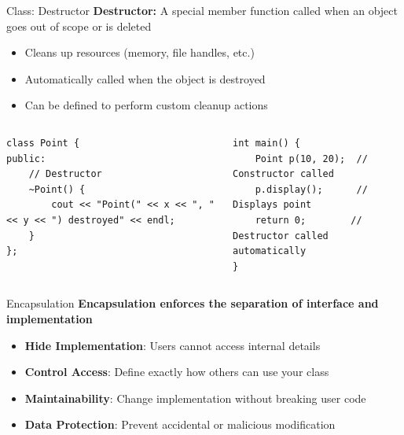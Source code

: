 \begin{frame}[fragile]{Class: Destructor}
	\textbf{Destructor:} A special member function called when an object goes out of scope or is deleted
	\begin{itemize}
		\item Cleans up resources (memory, file handles, etc.)
		\item Automatically called when the object is destroyed
		\item Can be defined to perform custom cleanup actions
	\end{itemize}

    \begin{columns}
        \begin{column}{0.5\textwidth}
	\begin{verbatim}
class Point {
public:
    // Destructor
    ~Point() {
        cout << "Point(" << x << ", " << y << ") destroyed" << endl;
    }
};
        \end{verbatim}
        \end{column}
        \begin{column}{0.5\textwidth}
                    \begin{verbatim}
int main() {
    Point p(10, 20);  // Constructor called
    p.display();      // Displays point
    return 0;        // Destructor called automatically
}
    \end{verbatim}
    \end{column}
    \end{columns}
\end{frame}



\begin{frame}[fragile]{Encapsulation}
	\textbf{Encapsulation enforces the separation of interface and implementation}
	\begin{itemize}
		\item \textbf{Hide Implementation}: Users cannot access internal details
		\item \textbf{Control Access}: Define exactly how others can use your class
		\item \textbf{Maintainability}: Change implementation without breaking user code
		\item \textbf{Data Protection}: Prevent accidental or malicious modification
	\end{itemize}

\end{frame}

